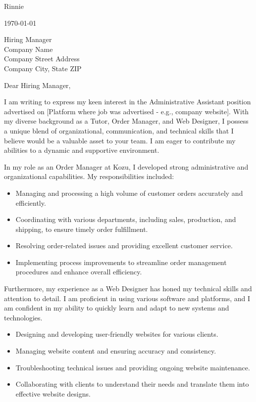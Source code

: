 \documentclass[letterpaper,11pt]{article}
\begin{document}
Rinnie \\
\vspace{20pt}

\today \\
\vspace{20pt}

Hiring Manager \\
Company Name \\
Company Street Address \\
Company City, State ZIP \\
\vspace{20pt}

Dear Hiring Manager, \\
\vspace{10pt}

I am writing to express my keen interest in the Administrative Assistant position advertised on [Platform where job was advertised - e.g., company website]. With my diverse background as a Tutor, Order Manager, and Web Designer, I possess a unique blend of organizational, communication, and technical skills that I believe would be a valuable asset to your team. I am eager to contribute my abilities to a dynamic and supportive environment.
\vspace{10pt}

In my role as an Order Manager at Kozu, I developed strong administrative and organizational capabilities. My responsibilities included:
\begin{itemize}
    \item Managing and processing a high volume of customer orders accurately and efficiently.
    \item Coordinating with various departments, including sales, production, and shipping, to ensure timely order fulfillment.
    \item Resolving order-related issues and providing excellent customer service.
    \item Implementing process improvements to streamline order management procedures and enhance overall efficiency.
\end{itemize}
Furthermore, my experience as a Web Designer has honed my technical skills and attention to detail. I am proficient in using various software and platforms, and I am confident in my ability to quickly learn and adapt to new systems and technologies.
\begin{itemize}
    \item Designing and developing user-friendly websites for various clients.
    \item Managing website content and ensuring accuracy and consistency.
    \item Troubleshooting technical issues and providing ongoing website maintenance.
    \item Collaborating with clients to understand their needs and translate them into effective website designs.
\end{itemize}
\vspace{10pt}
\end{document}
